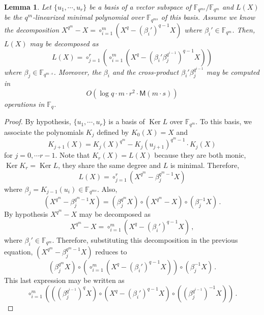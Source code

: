 \documentclass{sig-alternate}
\newcommand{\ff}[1]{\mathbb{F}_{#1}}
\newcommand{\qq}{q}
\newcommand{\nn}{n}
\newcommand{\basef}{\ff{\qq}}
\DeclareMathOperator{\Ker}{Ker}
\newcommand{\bigO}{O}
\newcommand{\Mul}{\mathsf{M}}
\newtheorem{Lem}{Lemma}
\begin{document}
\begin{Lem}
\label{linearized_decomposition}
Let $\{u_1, \cdots, u_r\}$ be a basis of a vector subspace of $\mathbb{F}_{\qq^{ms}}/\mathbb{F}_{\qq^m}$ and $L(X)$ be the
 $\qq^m$-linearized minimal polynomial over $\mathbb{F}_{\qq^{ms}}$ of this basis. Assume we know the decomposition
$X^{\qq^{m}}-X=\circ_{i=1}^{m} (X^{\qq}-(\beta_i')^{\qq-1} X)$ where $\beta_i' \in \mathbb{F}_{\qq^{m}}$. Then, $L(X)$ may be decomposed as
$$L(X)=\circ_{j=1}^{r} \left( \circ_{i=1}^{m} (X^\qq-(\beta_i'  \beta_j^{\qq^{i-1}})^{q-1}   X) \right)$$
where $\beta_j \in \mathbb{F}_{\qq^{m\cdot s}}$. Moreover, the $\beta_i$ and the cross-product $\beta_i' \beta_j^{q^{i-1}}$ may be computed in 
$$\bigO(\log q \cdot m \cdot r^2 \cdot \Mul(m \cdot s))$$
operations in $\basef$.
\end{Lem}
\begin{proof}
By hypothesis,  $\{u_1, \cdots, u_r\}$ is a basis of $\Ker L$ over $\mathbb{F}_{\qq^m}$.  To this basis, we associate the polynomials $K_j$ defined by $K_0(X)=X$ and 
$$K_{j+1}(X)=K_j(X)^{\qq^{m}}-K_j(u_{j+1})^{\qq^{m}-1} \cdot K_j(X)$$
 for $j=0, \cdots r-1$. Note that $K_r(X)=L(X)$ because they are both monic, $\Ker K_r=\Ker L$, they share the same degree and $L$ is minimal. Therefore,
$$L(X)=\circ_{j=1}^r (X^{\qq^m} -\beta_j^{\qq^m-1}X) $$
where $\beta_j=K_{j-1}(u_i) \in \mathbb{F}_{\qq^{ms}}$.
Also,  
\begin{equation}
\label{basic_decomp}
(X^{\qq^{m}}-\beta_j^{\qq^{m}-1} X)= (\beta_j^{\qq^{m}} X) \circ (X^{\qq^{m}}-X)\circ(\beta_j^{-1}X)\,.
\end{equation}
By hypothesis $X^{\qq^{m}}-X$ may be decomposed as
\begin{equation}
\label{decomp_basef}
X^{\qq^{m}}-X=\circ_{i=1}^{m} (X^{\qq}-(\beta_i')^{\qq-1} X)\,,
\end{equation}
where $\beta_i' \in \mathbb{F}_{\qq^{m}}$. Therefore, substituting this decomposition in the previous equation, $(X^{\qq^{m}}-\beta_j^{\qq^{m}-1} X)$ reduces to 
$$(\beta_j^{\qq^{m}} X) \circ    \left(    \circ_{i=1}^{m} (X^{\qq}  -(\beta_i')^{\qq-1}    X)  \right) \circ(\beta_j^{-1}X)\,.$$
This last expression may be written as
$$\circ_{i=1}^{m} \left( ((\beta_j^{\qq^{i-1}})^\qq X) \circ  (X^{\qq}- (\beta_i')^{\qq-1}    X) \circ   ((\beta_j^{\qq^{i-1}})^{-1}X)  \right)\,.$$ 

\end{proof}
\end{document}
